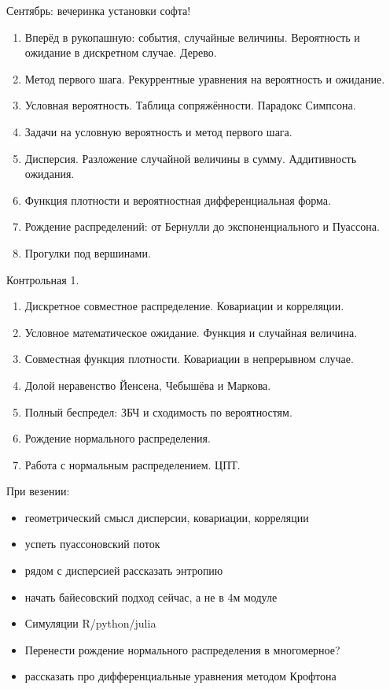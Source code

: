 \documentclass[12pt]{article}
\begin{document}
Сентябрь: вечеринка установки софта!


\begin{enumerate}
  \item Вперёд в рукопашную: события, случайные величины. Вероятность и ожидание в дискретном случае. Дерево.
  \item Метод первого шага. Рекуррентные уравнения на вероятность и ожидание.
  \item Условная вероятность. Таблица сопряжённости. Парадокс Симпсона.
  \item Задачи на условную вероятность и метод первого шага.
  \item Дисперсия. Разложение случайной величины в сумму. Аддитивность ожидания.
  \item Функция плотности и вероятностная дифференциальная форма.
  \item Рождение распределений: от Бернулли до экспоненциального и Пуассона.
  \item Прогулки под вершинами.
\end{enumerate}

Контрольная 1.

\begin{enumerate}[resume]
  \item Дискретное совместное распределение. Ковариации и корреляции.
  \item Условное математическое ожидание. Функция и случайная величина.
  \item Совместная функция плотности. Ковариации в непрерывном случае.
  \item Долой неравенство Йенсена, Чебышёва и Маркова.
  \item Полный беспредел: ЗБЧ и сходимость по вероятностям.
  \item Рождение нормального распределения.
  \item Работа с нормальным распределением. ЦПТ.
\end{enumerate}

При везении:

\begin{itemize}
  \item геометрический смысл дисперсии, ковариации, корреляции
  \item успеть пуассоновский поток
  \item рядом с дисперсией рассказать энтропию
  \item начать байесовский подход сейчас, а не в 4м модуле
  \item Симуляции R/python/julia
  \item Перенести рождение нормального распределения в многомерное?
  \item рассказать про дифференциальные уравнения методом Крофтона
\end{itemize}
\end{document}
